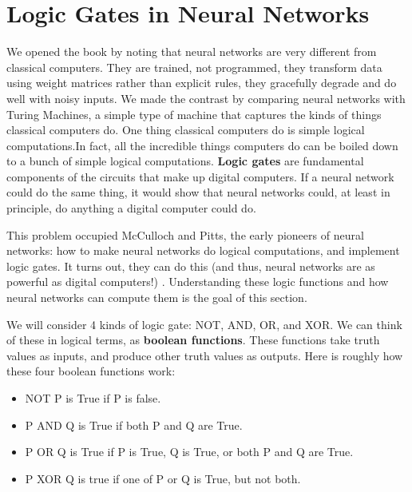 \chapter{Logic Gates in Neural Networks}\label{ch_logicgates}


We opened the book by noting that neural networks are very different from classical computers. They are trained, not programmed, they transform data using weight matrices rather than explicit rules, they gracefully degrade and do well with noisy inputs. We made the contrast by comparing neural networks with Turing Machines, a simple type of machine that captures the kinds of things classical computers do. One thing classical computers do is simple logical computations.In fact, all the incredible things computers do can be boiled down to a bunch of simple logical computations. \textbf{Logic gates} are fundamental components of the circuits that make up digital computers. If a neural network could do the same thing, it would show that neural networks could, at least in principle, do anything a digital computer could do.

This problem occupied McCulloch and Pitts, the early pioneers of neural networks: how to make neural networks do logical computations, and implement logic gates. It turns out, they can do this  (and thus, neural networks are as powerful as digital computers!) \cite{mcculloch1943logical}. Understanding these logic functions and how neural networks can compute them is the goal of this section.

We will consider 4 kinds of logic gate: NOT, AND, OR, and XOR. We can think of these in logical terms, as \textbf{boolean functions}. These functions take truth values as inputs, and produce other truth values as outputs. Here is roughly how these four boolean functions work:

\begin{itemize}
\item NOT P is True if P is false.
\item P AND Q is True if both P and Q are True.
\item P OR Q is True if P is True, Q is True, or both P and Q are True.
\item P XOR Q is true if one of P or Q is True, but not both.
\end{itemize}

